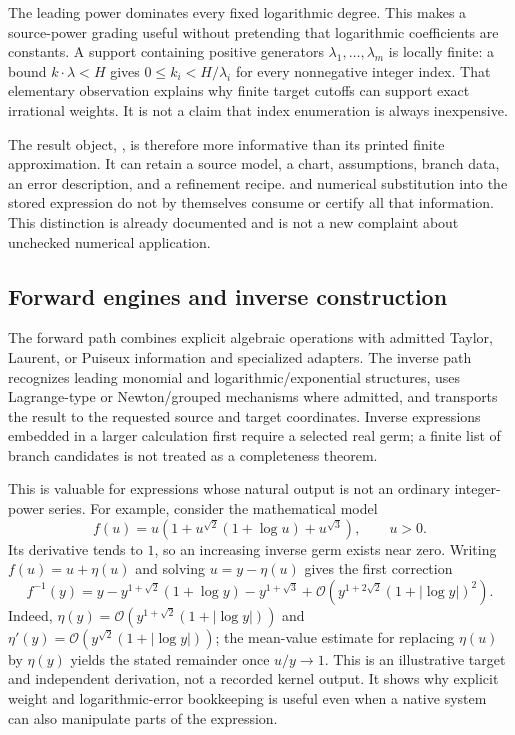 \documentclass[11pt,a4paper]{article}
\newcommand{\code}[1]{\texttt{\detokenize{#1}}}
\newcommand{\OO}{\mathcal O}
\begin{document}
The leading power dominates every fixed logarithmic degree. This makes a
source-power grading useful without pretending that logarithmic coefficients
are constants. A support containing positive generators $\lambda_1,\ldots,
\lambda_m$ is locally finite: a bound $k\cdot\lambda<H$ gives
$0\leq k_i<H/\lambda_i$ for every nonnegative integer index. That elementary
observation explains why finite target cutoffs can support exact irrational
weights. It is not a claim that index enumeration is always inexpensive.

The result object, \code{GeneralizedSeries}, is therefore more informative than
its printed finite approximation. It can retain a source model, a chart,
assumptions, branch data, an error description, and a refinement recipe.
\code{Normal[s]} and numerical substitution into the stored expression do not
by themselves consume or certify all that information. This distinction is
already documented and is not a new complaint about unchecked numerical
application. \cite{core,guide,status}

\subsection{Forward engines and inverse construction}

The forward path combines explicit algebraic operations with admitted Taylor,
Laurent, or Puiseux information and specialized adapters. The inverse path
recognizes leading monomial and logarithmic/exponential structures, uses
Lagrange-type or Newton/grouped mechanisms where admitted, and transports the
result to the requested source and target coordinates. Inverse expressions
embedded in a larger calculation first require a selected real germ; a finite
list of branch candidates is not treated as a completeness theorem.
\cite{core,inverseexpr,branches,lambert}

This is valuable for expressions whose natural output is not an ordinary
integer-power series. For example, consider the mathematical model
\[
 f(u)=u\left(1+u^{\sqrt2}(1+\log u)+u^{\sqrt3}\right),\qquad u>0.
\]
Its derivative tends to $1$, so an increasing inverse germ exists near zero.
Writing $f(u)=u+\eta(u)$ and solving $u=y-\eta(u)$ gives the first correction
\[
 f^{-1}(y)=y-y^{1+\sqrt2}(1+\log y)-y^{1+\sqrt3}
 +\OO\!\left(y^{1+2\sqrt2}(1+|\log y|)^2\right).
\]
Indeed, $\eta(y)=\OO(y^{1+\sqrt2}(1+|\log y|))$ and
$\eta'(y)=\OO(y^{\sqrt2}(1+|\log y|))$; the mean-value estimate for replacing
$\eta(u)$ by $\eta(y)$ yields the stated remainder once $u/y\to1$.
This is an illustrative target and independent derivation, not a recorded
kernel output. It shows why explicit weight and logarithmic-error bookkeeping
is useful even when a native system can also manipulate parts of the expression.
\end{document}
